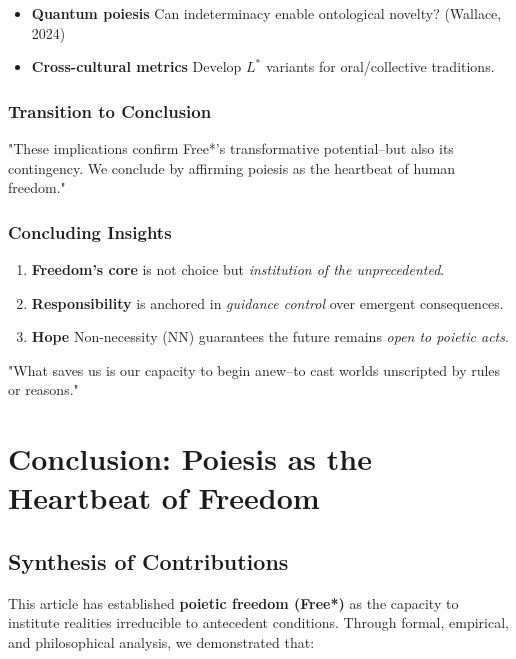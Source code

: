 \documentclass[11pt,a4paper]{article}
\begin{document}
\begin{itemize}
  \item \textbf{Quantum poiesis} Can indeterminacy enable ontological novelty? (Wallace, 2024)
  \item \textbf{Cross-cultural metrics} Develop \(L^{*}\) variants for oral/collective traditions.
\end{itemize}

\subsubsection{Transition to Conclusion}

"These implications confirm Free*'s transformative potential--but also its contingency. We conclude by affirming poiesis as the heartbeat of human freedom."

\subsubsection{Concluding Insights}

\begin{enumerate}
  \item \textbf{Freedom's core} is not choice but \emph{institution of the unprecedented}.
  \item \textbf{Responsibility} is anchored in \emph{guidance control} over emergent consequences.
  \item \textbf{Hope} Non-necessity (NN) guarantees the future remains \emph{open to poietic acts}.
\end{enumerate}

"What saves us is our capacity to begin anew--to cast worlds unscripted by rules or reasons." \cite[ p. 246]{arendt1958}

\section{Conclusion: Poiesis as the Heartbeat of Freedom}\label{sec:conclusion}

\subsection{Synthesis of Contributions}

This article has established \textbf{poietic freedom (Free*)} as the capacity to institute realities irreducible to antecedent conditions. Through formal, empirical, and philosophical analysis, we demonstrated that:
\end{document}
